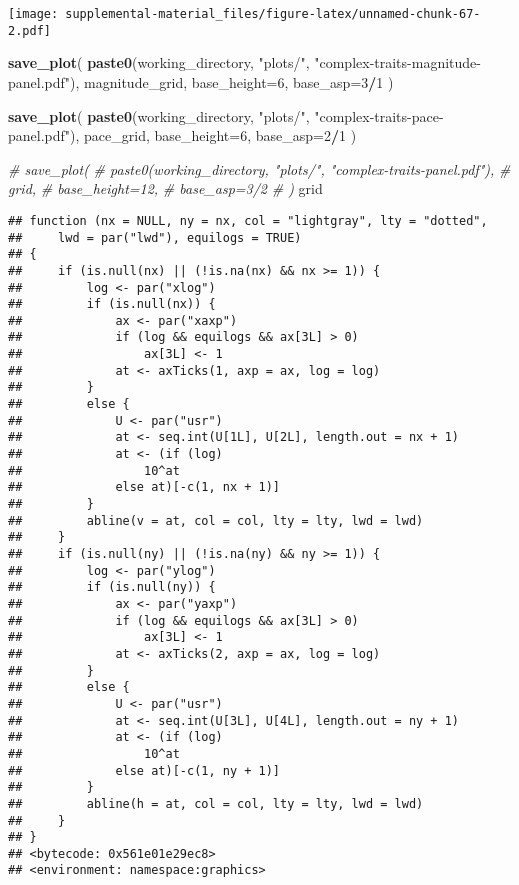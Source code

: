 \documentclass[]{book}
\newenvironment{Shaded}{\begin{snugshade}}{\end{snugshade}}
\newcommand{\CommentTok}[1]{\textcolor[rgb]{0.56,0.35,0.01}{\textit{#1}}}
\newcommand{\DataTypeTok}[1]{\textcolor[rgb]{0.13,0.29,0.53}{#1}}
\newcommand{\DecValTok}[1]{\textcolor[rgb]{0.00,0.00,0.81}{#1}}
\newcommand{\KeywordTok}[1]{\textcolor[rgb]{0.13,0.29,0.53}{\textbf{#1}}}
\newcommand{\NormalTok}[1]{#1}
\newcommand{\OperatorTok}[1]{\textcolor[rgb]{0.81,0.36,0.00}{\textbf{#1}}}
\newcommand{\StringTok}[1]{\textcolor[rgb]{0.31,0.60,0.02}{#1}}
\begin{document}
\texttt{[image: supplemental-material\_files/figure-latex/unnamed-chunk-67-2.pdf]}

\begin{Shaded}
\begin{Highlighting}[]
\KeywordTok{save_plot}\NormalTok{(}
   \KeywordTok{paste0}\NormalTok{(working_directory, }\StringTok{"plots/"}\NormalTok{, }\StringTok{"complex-traits-magnitude-panel.pdf"}\NormalTok{),}
\NormalTok{   magnitude_grid,}
   \DataTypeTok{base_height=}\DecValTok{6}\NormalTok{,}
   \DataTypeTok{base_asp=}\DecValTok{3}\OperatorTok{/}\DecValTok{1}
\NormalTok{)}

\KeywordTok{save_plot}\NormalTok{(}
   \KeywordTok{paste0}\NormalTok{(working_directory, }\StringTok{"plots/"}\NormalTok{, }\StringTok{"complex-traits-pace-panel.pdf"}\NormalTok{),}
\NormalTok{   pace_grid,}
   \DataTypeTok{base_height=}\DecValTok{6}\NormalTok{,}
   \DataTypeTok{base_asp=}\DecValTok{2}\OperatorTok{/}\DecValTok{1}
\NormalTok{)}

\CommentTok{# save_plot(}
\CommentTok{#    paste0(working_directory, "plots/", "complex-traits-panel.pdf"),}
\CommentTok{#    grid,}
\CommentTok{#    base_height=12,}
\CommentTok{#    base_asp=3/2}
\CommentTok{# )}
\NormalTok{grid}
\end{Highlighting}
\end{Shaded}

\begin{verbatim}
## function (nx = NULL, ny = nx, col = "lightgray", lty = "dotted", 
##     lwd = par("lwd"), equilogs = TRUE) 
## {
##     if (is.null(nx) || (!is.na(nx) && nx >= 1)) {
##         log <- par("xlog")
##         if (is.null(nx)) {
##             ax <- par("xaxp")
##             if (log && equilogs && ax[3L] > 0) 
##                 ax[3L] <- 1
##             at <- axTicks(1, axp = ax, log = log)
##         }
##         else {
##             U <- par("usr")
##             at <- seq.int(U[1L], U[2L], length.out = nx + 1)
##             at <- (if (log) 
##                 10^at
##             else at)[-c(1, nx + 1)]
##         }
##         abline(v = at, col = col, lty = lty, lwd = lwd)
##     }
##     if (is.null(ny) || (!is.na(ny) && ny >= 1)) {
##         log <- par("ylog")
##         if (is.null(ny)) {
##             ax <- par("yaxp")
##             if (log && equilogs && ax[3L] > 0) 
##                 ax[3L] <- 1
##             at <- axTicks(2, axp = ax, log = log)
##         }
##         else {
##             U <- par("usr")
##             at <- seq.int(U[3L], U[4L], length.out = ny + 1)
##             at <- (if (log) 
##                 10^at
##             else at)[-c(1, ny + 1)]
##         }
##         abline(h = at, col = col, lty = lty, lwd = lwd)
##     }
## }
## <bytecode: 0x561e01e29ec8>
## <environment: namespace:graphics>
\end{verbatim}
\end{document}
